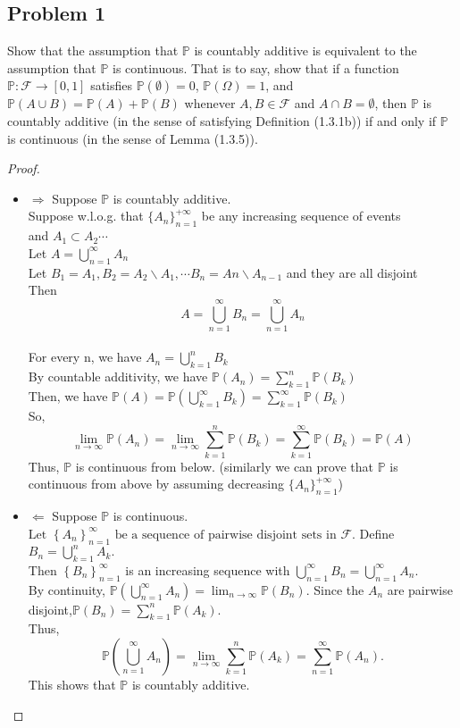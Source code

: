 \documentclass[letterpaper, 11pt]{article}
\newcommand{\1}{\mathds{1}}	%
\theoremstyle{definition}
\begin{document}
\subsection*{Problem 1}
Show that the assumption that $\mathbb{P}$ is countably additive is equivalent to the assumption that $\mathbb{P}$ is continuous. That is to say, show that if a function $\mathbb{P} : \mathcal{F} \rightarrow [0, 1]$ satisfies $\mathbb{P}(\emptyset) = 0$, $\mathbb{P}(\Omega) = 1$, and $\mathbb{P}(A \cup B) = \mathbb{P}(A) + \mathbb{P}(B)$ whenever $A, B \in \mathcal{F}$ and $A \cap B = \emptyset$, then $\mathbb{P}$ is countably additive (in the sense of satisfying Definition (1.3.1b)) if and only if $\mathbb{P}$ is continuous (in the sense of Lemma (1.3.5)).
\begin{proof}
    \begin{itemize}
    \item $\Rightarrow$ Suppose $\mathbb{P}$ is countably additive. \\
    Suppose w.l.o.g. that $ \{A_n\}_{n=1}^{+\infty} $ be any increasing sequence of events\\
    and $ A_1\subset A_2\cdots $ \\
    Let $ A=\bigcup_{n=1}^{\infty}A_n $\\
    Let $ B_1=A_1,B_2=A_2\backslash A_1,\cdots B_n=An\backslash A_{n-1} $ and they are all disjoint\\
    Then $$ A=\bigcup_{n=1}^{\infty}B_n= \bigcup_{n=1}^{\infty}A_n$$\\  
    For every n, we have $ A_n=\bigcup_{k=1}^{n}B_k $\\
    By countable additivity, we have $ \mathbb{P}(A_n)=\sum_{k=1}^{n}\mathbb{P}(B_k) $\\
    Then, we have $ \mathbb{P}(A)=\mathbb{P}(\bigcup_{k=1}^{\infty}B_k)=\sum_{k=1}^{\infty}\mathbb{P}(B_k) $\\
    So, $$\lim_{n\to\infty}\mathbb{P}(A_n)= \lim_{n\to\infty}\sum_{k=1}^{n}\mathbb{P}(B_k)=\sum_{k=1}^{\infty}\mathbb{P}(B_k)=\mathbb{P}(A)$$
    Thus, $\mathbb{P}$ is continuous from below. (similarly we can prove that $\mathbb{P}$ is continuous from above by assuming decreasing $ \{A_n\}_{n=1}^{+\infty} $)\\
    \item $\Leftarrow$ Suppose $\mathbb{P}$ is continuous.\\
    $\text{Let } \left\{ A_{n} \right\}_{n=1}^{\infty} \text{ be a sequence of pairwise disjoint sets in } \mathcal{F}.$
     Define $ B_{n} = \bigcup_{k=1}^{n} A_{k}.$\\Then $ \left\{ B_{n} \right\}_{n=1}^{\infty}$ is an increasing sequence with $ \bigcup_{n=1}^{\infty} B_{n} = \bigcup_{n=1}^{\infty} A_{n}.$ \\By continuity,
     $\mathbb{P}\left( \bigcup_{n=1}^{\infty} A_{n} \right) = \lim_{n \to \infty} \mathbb{P}(B_{n}).$
Since the $A_{n}$ are pairwise disjoint,$\mathbb{P}(B_{n}) = \sum_{k=1}^{n} \mathbb{P}(A_{k}).$
\\Thus,$$\mathbb{P}\left( \bigcup_{n=1}^{\infty} A_{n} \right) = \lim_{n \to \infty} \sum_{k=1}^{n} \mathbb{P}(A_{k}) = \sum_{n=1}^{\infty} \mathbb{P}(A_{n}).$$
This shows that $\mathbb{P}$ is countably additive.
    \end{itemize}
\end{proof}
\end{document}

